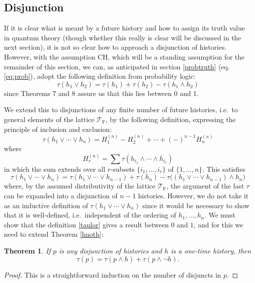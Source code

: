 \documentclass[12pt,a4paper,reqno]{article}
\renewcommand{\(}{\left(}
\renewcommand{\)}{\right)}
\newcommand{\TF}{\mathcal{T}_\text{F}}
\newcommand{\<}{\langle}
\renewcommand{\>}{\rangle}
\newcommand{\be}{\begin{equation}}
\newcommand{\ee}{\end{equation}}
\theoremstyle{plain} %
\newtheorem{thm}{Theorem}
\begin{document}
\subsection{Disjunction}
\label{subsec:disjunction}

If it is clear what is meant by a future history and how to assign its truth value in quantum theory (though whether this really is clear will be discussed in the next section), it is not so clear how to approach a disjunction of histories. However, with the assumption CH, which will be a standing assumption for the remainder of this section, we can, as anticipated in section \ref{probtruth} (eq. \eqref{eq:prob}),  adopt the following definition from probability logic:
\be\label{truthdisj}
\tau(h_1\lor h_2) = \tau(h_1) + \tau(h_2) - \tau(h_1\land h_2)
\ee
since Theorems 7 and 8 assure us that this lies between 0 and 1.

We extend this to disjunctions of any finite number of future histories, i.e.\ to general elements of the lattice $\TF$, by the following definition, expressing the principle of inclusion and exclusion:
\be\label{taulor}
\tau(h_1\lor\cdots\lor h_n) = H^{(n)}_1 - H^{(n)}_2 + \cdots + (-)^{n-1}H^{(n)}_n
\ee
where
\be\label{H}
H^{(n)}_r = \sum\tau(h_{i_1}\land\cdots\land h_{i_r})
\ee
in which the sum extends over all $r$-subsets $\{i_1,\ldots,i_r\}$ of $\{1,\ldots ,n\}$.
This satisfies 
\be\label{disjinduction}
\tau(h_1\lor\cdots\lor h_n) = \tau(h_1\lor\cdots\lor h_{n-1}) + \tau(h_n) - \tau\big( (h_1\lor\cdots\lor h_{n-1})\land h_n\big)
\ee
where, by the assumed distributivity of the lattice $\TF$, the argument of the last $\tau$ can be expanded into a disjunction of $n-1$ histories. However, we do not take it as an inductive definition of $\tau(h_1\lor\cdots\lor h_n)$ since it would be necessary to show that it is well-defined, i.e.\ independent of the ordering of $h_1,\ldots,h_n$. We must show that the definition \eqref{taulor} gives a result between $0$ and $1$, and for this we need to extend Theorem \ref{hnoth}:
\begin{thm}\label{genhnoth}
If $p$ is any disjunction of histories and $h$ is a one-time history, then
\[
\tau(p) = \tau(p\land h) + \tau(p\land\lnot h).
\]
\end{thm}
\begin{proof}
This is a straightforward induction on the number of disjuncts in $p$.
\end{proof}
\end{document}
